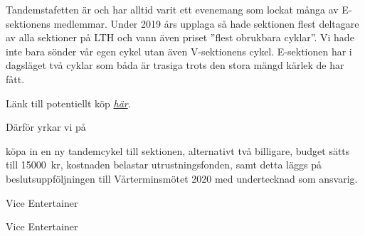 \documentclass[../_main/handlingar.tex]{subfiles}
\begin{document}

Tandemstafetten är och har alltid varit ett evenemang som lockat många av E-sektionens
medlemmar. Under 2019 års upplaga så hade sektionen flest deltagare av alla sektioner på
LTH och vann även priset ”flest obrukbara cyklar”. Vi hade inte bara sönder vår egen cykel
utan även V-sektionens cykel. E-sektionen har i dagsläget två cyklar som båda är trasiga trots
den stora mängd kärlek de har fått.

Länk till potentiellt köp \href{https://www.sportfritid.se/monark-tandem-3-vxl.html}{\textit{här}}.

Därför yrkar vi på
\begin{attsatser}
    \att köpa in en ny tandemcykel till sektionen, alternativt två billigare,
    \att budget sätts till \SI{15000}{kr},
    \att kostnaden belastar utrustningsfonden, samt
    \att detta läggs på beslutsuppföljningen till Vårterminsmötet 2020 med undertecknad som ansvarig.
\end{attsatser}

\begin{signatures}{2}
    \mvh
    \signature{Simon Mahdavi}{Vice Entertainer}
    \signature{Casper Schwerin}{Vice Entertainer}
\end{signatures}
\end{document}
